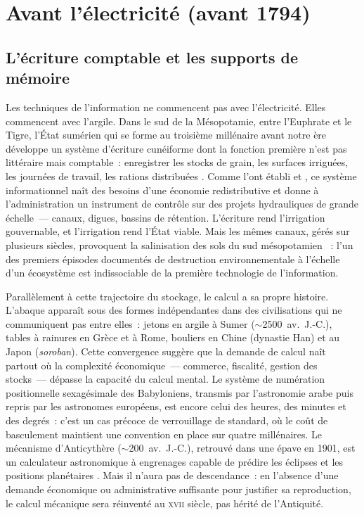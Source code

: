 \section{Avant l'électricité (avant 1794)}\label{sec:era0}

\subsection{L'écriture comptable et les supports de mémoire}\label{subsec:ecriture}

Les techniques de l'information ne commencent pas avec l'électricité. Elles commencent avec l'argile. Dans le sud de la Mésopotamie, entre l'Euphrate et le Tigre, l'État sumérien qui se forme au troisième millénaire avant notre ère développe un système d'écriture cunéiforme dont la fonction première n'est pas littéraire mais comptable~: enregistrer les stocks de grain, les surfaces irriguées, les journées de travail, les rations distribuées \parencite{nissen_archaic_1993}. Comme l'ont établi \textcite{nissen_archaic_1993} et \textcite{englund_hard_1991}, ce système informationnel naît des besoins d'une économie redistributive et donne à l'administration un instrument de contrôle sur des projets hydrauliques de grande échelle~--- canaux, digues, bassins de rétention. %
L'écriture rend l'irrigation gouvernable, et l'irrigation rend l'État viable. %
Mais les mêmes canaux, gérés sur plusieurs siècles, provoquent la salinisation des sols du sud mésopotamien \parencite{dickson_circumscription_1987}~: l'un des premiers épisodes documentés de destruction environnementale à l'échelle d'un écosystème est indissociable de la première technologie de l'information.

Parallèlement à cette trajectoire du stockage, le calcul a sa propre histoire. L'abaque apparaît sous des formes indépendantes dans des civilisations qui ne communiquent pas entre elles~: jetons en argile à Sumer ($\sim$2500~av.~J.-C.), tables à rainures en Grèce et à Rome, bouliers en Chine (dynastie Han) et au Japon (\emph{soroban}). %
Cette convergence suggère que la demande de calcul naît partout où la complexité économique~--- commerce, fiscalité, gestion des stocks~--- dépasse la capacité du calcul mental. Le système de numération positionnelle sexagésimale des Babyloniens, transmis par l'astronomie arabe puis repris par les astronomes européens, est encore celui des heures, des minutes et des degrés~: %
c'est un cas précoce de verrouillage de standard, où le coût de basculement maintient une convention en place sur quatre millénaires. Le mécanisme d'Anticythère ($\sim$200~av.~J.-C.), retrouvé dans une épave en 1901, est un calculateur astronomique à engrenages capable de prédire les éclipses et les positions planétaires \parencite{freeth_decoding_2006}. Mais il n'aura pas de descendance~: en l'absence d'une demande économique ou administrative suffisante pour justifier sa reproduction, le calcul mécanique sera réinventé au \textsc{xvii}\ieme{} siècle, pas hérité de l'Antiquité.

